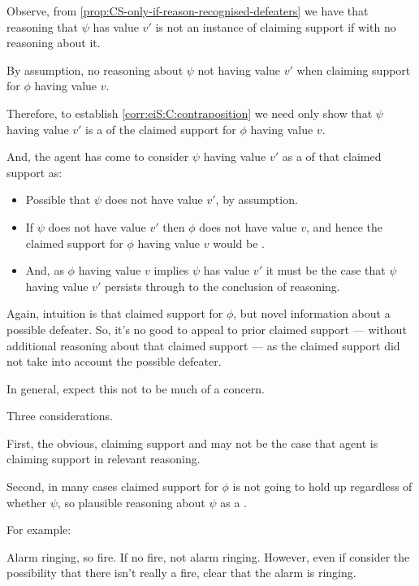 \begin{note}
  Observe, from \autoref{prop:CS-only-if-reason-recognised-defeaters} we have that reasoning that \(\psi\) has value \(v'\) is not an instance of claiming support {\color{red} if \requ{} with no reasoning about it}.

  By assumption, no reasoning about \(\psi\) not having value \(v'\) when claiming support for \(\phi\) having value \(v\).

  Therefore, to establish \autoref{corr:eiS:C:contraposition} we need only show that \(\psi\) having value \(v'\) is a \expec{} of the claimed support for \(\phi\) having value \(v\).

  And, the agent has come to consider \(\psi\) having value \(v'\) as a \requ{} of that claimed support as:
  \begin{itemize}
  \item Possible that \(\psi\) does not have value \(v'\), by assumption.
  \item If \(\psi\) does not have value \(v'\) then \(\phi\) does not have value \(v\), and hence the claimed support for \(\phi\) having value \(v\) would be \misled{}.
  \item And, as \(\phi\) having value \(v\) implies \(\psi\) has value \(v'\) it must be the case that \(\psi\) having value \(v'\) persists through to the conclusion of reasoning.
  \end{itemize}
\end{note}

\begin{note}
  Again, intuition is that claimed support for \(\phi\), but novel information about a possible defeater.
  So, it's no good to appeal to prior claimed support --- without additional reasoning about that claimed support --- as the claimed support did not take into account the possible defeater.
\end{note}

\begin{note}
  In general, expect this not to be much of a concern.

  Three considerations.
\end{note}

\begin{note}
  First, the obvious, claiming support and may not be the case that agent is claiming support in relevant reasoning.
\end{note}


\begin{note}
  Second, in many cases claimed support for \(\phi\) is not going to hold up regardless of whether \(\psi\), so plausible reasoning about \(\psi\) as a \requ{}.

  For example:

  Alarm ringing, so fire.
  If no fire, not alarm ringing.
  However, even if consider the possibility that there isn't really a fire, clear that the alarm is ringing.
\end{note}


